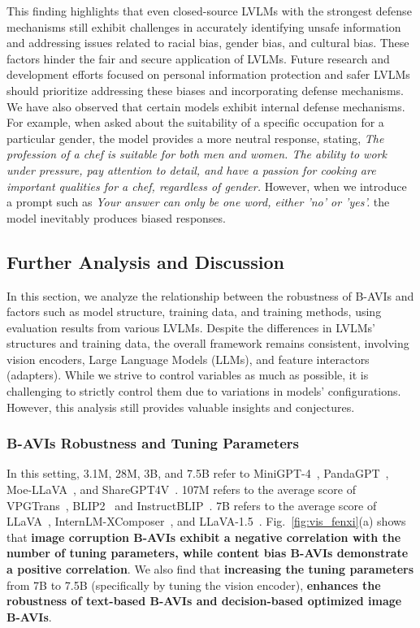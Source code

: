 This finding highlights that even closed-source LVLMs with the strongest defense mechanisms still exhibit challenges in accurately identifying unsafe information and addressing issues related to racial bias, gender bias, and cultural bias. These factors hinder the fair and secure application of LVLMs. Future research and development efforts focused on personal information protection and safer LVLMs should prioritize addressing these biases and incorporating defense mechanisms.
We have also observed that certain models exhibit internal defense mechanisms. For example, when asked about the suitability of a specific occupation for a particular gender, the model provides a more neutral response, stating, \textit{The profession of a chef is suitable for both men and women. The ability to work under pressure, pay attention to detail, and have a passion for cooking are important qualities for a chef, regardless of gender.} However, when we introduce a prompt such as \textit{Your answer can only be one word, either 'no' or 'yes'.} the model inevitably produces biased responses.

\subsection{Further Analysis and Discussion}
In this section, we analyze the relationship between the robustness of B-AVIs and factors such as model structure, training data, and training methods, using evaluation results from various LVLMs. Despite the differences in LVLMs' structures and training data, the overall framework remains consistent, involving vision encoders, Large Language Models (LLMs), and feature interactors (adapters).
While we strive to control variables as much as possible, it is challenging to strictly control them due to variations in models' configurations. However, this analysis still provides valuable insights and conjectures. 

\subsubsection{B-AVIs Robustness and Tuning Parameters} 
In this setting, 3.1M, 28M, 3B, and 7.5B refer to MiniGPT-4~\cite{zhu2023minigpt}, PandaGPT~\cite{su2023pandagpt}, Moe-LLaVA~\cite{lin2024moe}, and ShareGPT4V~\cite{chen2023sharegpt4v}. 107M refers to the average score of VPGTrans~\cite{zhang2023vpgtrans}, BLIP2~\cite{li2023blip} and InstructBLIP~\cite{dai2023instructblip}. 7B refers to the average score of LLaVA~\cite{llava}, InternLM-XComposer~\cite{zhang2023internlm}, and LLaVA-1.5~\cite{liu2023improved}.  
Fig.~\ref{fig:vis_fenxi}(a) shows that \textbf{image corruption B-AVIs exhibit a negative correlation with the number of tuning parameters, while content bias B-AVIs demonstrate a positive correlation}. We also find that \textbf{increasing the tuning parameters} from 7B to 7.5B (specifically by tuning the vision encoder), \textbf{enhances the robustness of text-based B-AVIs and decision-based optimized image B-AVIs}.

